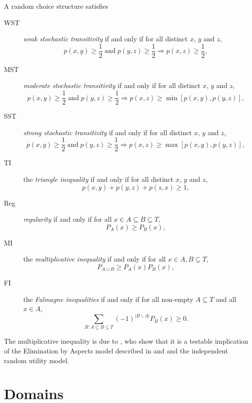 \documentclass[11pt,letter]{article}
\begin{document}
A random choice structure satisfies
\begin{description}
	\item[WST] {\em weak stochastic transitivity} if and only if for all distinct
	$x$, $y$ and $z$,
	\[
		p(x,y) \geq \frac{1}{2}\;\mbox{and}\; p(y,z) \geq \frac{1}{2}
		\Rightarrow p(x,z) \geq \frac{1}{2},
	\]
	\item[MST] {\em moderate stochastic transitivity} if and only if for all distinct
	$x$, $y$ and $z$,
	\[
		p(x,y) \geq \frac{1}{2}\;\mbox{and}\; p(y,z) \geq \frac{1}{2}
		\Rightarrow p(x,z) \geq \min[ p(x,y), p(y,z) ],
	\]
	\item[SST] {\em strong stochastic transitivity} if and only if for all distinct
	$x$, $y$ and $z$,
	\[
		p(x,y) \geq \frac{1}{2}\;\mbox{and}\; p(y,z) \geq \frac{1}{2}
		\Rightarrow p(x,z) \geq \max[ p(x,y), p(y,z) ],
	\]
	\item[TI] the {\em triangle inequality} if and only if for all distinct
	$x$, $y$ and $z$,
	\[
		p(x,y) + p(y,z) + p(z,x) \geq 1,
	\]
	\item[Reg] {\em regularity} if and only if for all $x \in A \subseteq B \subseteq T$,
	\[
		P_A(x) \geq P_B(x),
	\]
	\item[MI] the {\em multiplicative inequality} if and only if for all $x \in A, B \subseteq T$,
	\[
		P_{A \cup B} \geq P_A(x) P_B(x),
	\]
	\item[FI] the {\em Falmagne inequalities} if and only if for all non-empty
	$A \subseteq T$ and all $x \in A$,
	\begin{equation}\label{e:BMP}
		\sum_{B \colon A \subseteq B \subseteq T} (-1)^{|B \backslash A|} P_B(x) \geq 0.
	\end{equation}
\end{description}

The multiplicative inequality is due to , who show that it is a testable implication of the Elimination by Aspects model described in  and  and the independent random utility model.


\section{Domains}\label{s:domains}
\end{document}
